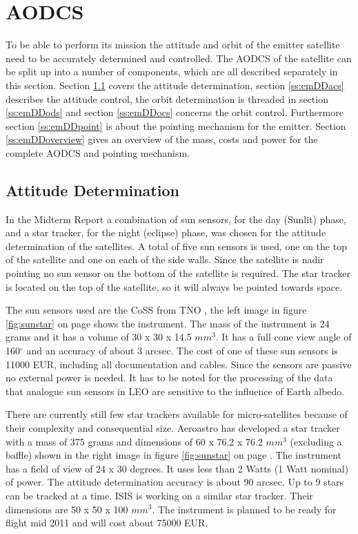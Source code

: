 \section{\acl{AODCS}}
\label{emDDadcs}
To be able to perform its mission the attitude and orbit of the emitter satellite need to be accurately determined and controlled. The \ac{AODCS} of the satellite can be split up into a number of components, which are all described separately in this section. Section \ref{ss:emDDads} covers the attitude determination, section \ref{ss:emDDacs} describes the attitude control, the orbit determination is threaded in section \ref{ss:emDDods} and section \ref{ss:emDDocs} concerns the orbit control. Furthermore section \ref{ss:emDDpoint} is about the pointing mechanism for the emitter. Section \ref{ss:emDDoverview} gives an overview of the mass, costs and power for the complete \ac{AODCS} and pointing mechanism.

\subsection{Attitude Determination}
\label{ss:emDDads}
In the Midterm Report \cite{midterm} a combination of sun sensors, for the day (Sunlit) phase, and a star tracker, for the night (eclipse) phase, was chosen for the attitude determination of the satellites. A total of five sun sensors is used, one on the top of the satellite and one on each of the side walls. Since the satellite is nadir pointing no sun sensor on the bottom of the satellite is required. The star tracker is located on the top of the satellite, so it will always be pointed towards space.

The sun sensors used are the \ac{CoSS} from TNO \cite{tnoweb}, the left image in figure \ref{fig:sunstar} on page \pageref{fig:sunstar} shows the instrument. The mass of the instrument is 24 grams and it has a volume of 30 x 30 x 14.5 $mm^3$. It has a full cone view angle of 160${}^\circ$ and an accuracy of about 3 arcsec. The cost of one of these sun sensors is 11000 EUR, including all documentation and cables. Since the sensors are passive no external power is needed. It has to be noted for the processing of the data that analogue sun sensors in \ac{LEO} are sensitive to the influence of Earth albedo.

There are currently still few star trackers available for micro-satellites because of their complexity and consequential size. Aeroastro has developed a star tracker with a mass of 375 grams and dimensions of 60 x 76.2 x 76.2 $mm^3$ (excluding a baffle) shown in the right image in figure \ref{fig:sunstar} on page \pageref{fig:sunstar}. The instrument has a field of view of 24 x 30 degrees. It uses less than 2 Watts (1 Watt nominal) of power. The attitude determination accuracy is about 90 arcsec. Up to 9 stars can be tracked at a time. \ac{ISIS} \cite{cubesatshop} is working on a similar star tracker. Their dimensions are 50 x 50 x 100 $mm^3$. The instrument is planned to be ready for flight mid 2011 and will cost about 75000 EUR. 

